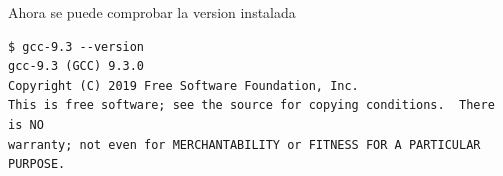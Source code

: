 \documentclass[12pt]{article}
\begin{document}
Ahora se puede comprobar la version instalada
\begin{lstlisting}[frame=single]
$ gcc-9.3 --version
gcc-9.3 (GCC) 9.3.0
Copyright (C) 2019 Free Software Foundation, Inc.
This is free software; see the source for copying conditions.  There is NO
warranty; not even for MERCHANTABILITY or FITNESS FOR A PARTICULAR PURPOSE.
\end{lstlisting}
%
%
%
%
%
%
%
%
\end{document}
